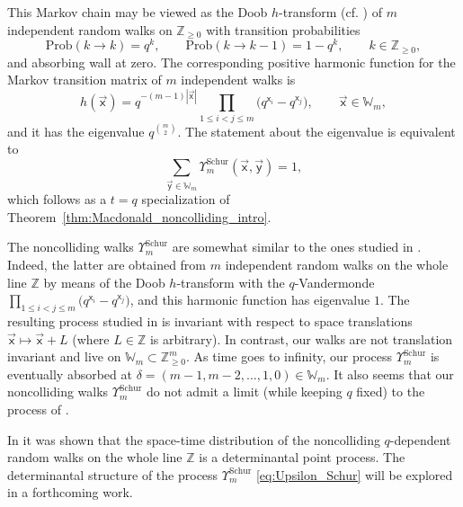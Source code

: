 \documentclass[pdftex]{sigma}
\numberwithin{equation}{section}
\begin{document}
This Markov chain may be viewed as the Doob $h$-transform (cf.
\cite{Konig2005, konig2002non})
of $m$ independent random walks on $\mathbb{Z}_{\ge0}$ with transition
probabilities
\begin{equation*}
	\mathrm{Prob}(k\to k)=q^{k},\qquad
	\mathrm{Prob}(k\to k-1)=1-q^{k},\qquad k\in \mathbb{Z}_{\ge0},
\end{equation*}
and absorbing wall at zero.
The corresponding positive harmonic function for the
Markov transition matrix of $m$
independent walks is
\begin{equation*}
	h(\vec{\mathsf{x}})=
	q^{-(m-1)|\vec{\mathsf{x}}|}
	\prod_{1\le i<j\le m}\big(q^{\mathsf{x}_i}-q^{\mathsf{x}_j}\big),
	\qquad \vec{\mathsf{x}}\in \mathbb{W}_{m},
\end{equation*}
and it has the eigenvalue $q^{\binom{m}{2}}$.
The statement about the eigenvalue is equivalent to
\begin{equation*}
	\sum_{\vec{\mathsf{y}}\in \mathbb{W}_m}
	\Upsilon_m^{\mathrm{Schur}}(\vec{\mathsf{x}},\vec{\mathsf{y}})=1,
\end{equation*}
which follows as a $t=q$ specialization of Theorem~\ref{thm:Macdonald_noncolliding_intro}.

The noncolliding walks $\Upsilon_m^{\mathrm{Schur}}$
are somewhat similar to the ones studied in
\cite{BG2011non}. Indeed, the latter
are obtained from $m$ independent random walks on the whole line
$\mathbb{Z}$
by means of the Doob $h$-transform with the $q$-Vandermonde
$\prod_{1\le i<j\le m}\big(q^{\mathsf{x}_i}-q^{\mathsf{x}_j}\big)$, and this
harmonic function has
eigenvalue $1$.
The resulting process studied in \cite{BG2011non}
is invariant with respect to space translations
$\vec{\mathsf{x}}\mapsto \vec{\mathsf{x}}+L$
(where $L\in \mathbb{Z}$ is arbitrary).
In contrast, our walks are not translation invariant and
live on $\mathbb{W}_m\subset \mathbb{Z}_{\ge0}^m$.
As time goes to infinity, our process $\Upsilon_m^{\mathrm{Schur}}$ is
eventually
absorbed at $\delta=(m-1,m-2,\dots,1,0 )\in \mathbb{W}_m$.
It also seems that our noncolliding walks $\Upsilon_m^{\mathrm{Schur}}$
do not admit a limit (while keeping $q$ fixed)
to the process of \cite{BG2011non}.

In \cite{BG2011non} it was shown that the space-time distribution
of the noncolliding $q$-dependent random walks on the whole line $\mathbb{Z}$
is a determinantal point process. The determinantal structure
of the process $\Upsilon_m^{\mathrm{Schur}}$ \eqref{eq:Upsilon_Schur}
will be explored in a forthcoming work.
\end{document}
